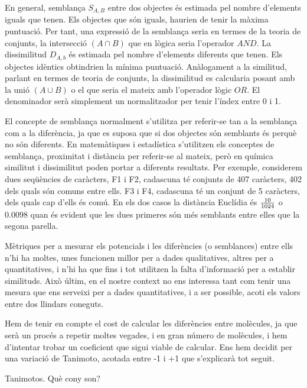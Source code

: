 \documentclass[titlepage,a4paper,12pt]{book}
\begin{document}
En general, semblança $S_{A,B}$ entre dos objectes és estimada pel nombre
d'elements iguals que tenen. Els objectes que són iguals, haurien de tenir la
màxima puntuació. Per tant, una expressió de la semblança seria en termes de la
teoria de conjunts, la intersecció $(A\cap B)$ que en lògica seria l'operador
$AND$. La dissimilitud $D_{A,b}$ és estimada pel nombre d'elements diferents que
tenen. Els objectes idèntics obtindrien la mínima puntuació. Anàlogament a la
similitud, parlant en termes de teoria de conjunts, la dissimilitud es
calcularia posant amb la unió $(A\cup B)$ o el que seria el mateix amb
l'operador lògic $OR$. El denominador serà simplement un normalitzador per tenir
l'índex entre 0 i 1. 

El concepte de semblança normalment s'utilitza per referir-se tan a la semblança
com a la diferència, ja que es suposa que si dos objectes són semblants és
perquè no són diferents. En matemàtiques i estadística s'utilitzen els conceptes
de semblança, proximitat i distància per referir-se al mateix, però en química
similitut i dissimilitut poden portar a diferents resultats. Per exemple,
considerem dues seqüències de caràcters, F1 i F2, cadascuna té conjunts de 407
caràcters, 402 dels quals són comuns entre ells. F3 i F4, cadascuna té un
conjunt de 5 caràcters, dels quals cap d'ells és comú. En els dos casos la
distància Euclídia és $10 \over 1024$  o $0.0098$ quan és evident que les dues
primeres són més semblants entre elles que la segona parella.


Mètriques per a mesurar els potencials i les diferències (o semblances) entre
ells n'hi ha moltes, unes funcionen millor per a dades qualitatives, altres per
a quantitatives, i n'hi ha que fins i tot utilitzen la falta d'informació per a
establir similituds.  Això últim, en el nostre context no ens interessa tant com
tenir una mesura que ens serveixi per a dades quantitatives, i a ser possible,
acoti els valors entre dos llindars coneguts.

Hem de tenir en compte el cost de calcular les diferències entre molècules, ja
que serà un procés a repetir moltes vegades, i en gran número de molècules, i
hem d'intentar trobar un coeficient que sigui viable de calcular.  Ens hem
decidit per una variació de Tanimoto, acotada entre -1 i +1 que s'explicarà tot
seguit.


Tanimotos. Què cony son? %

\end{document}

